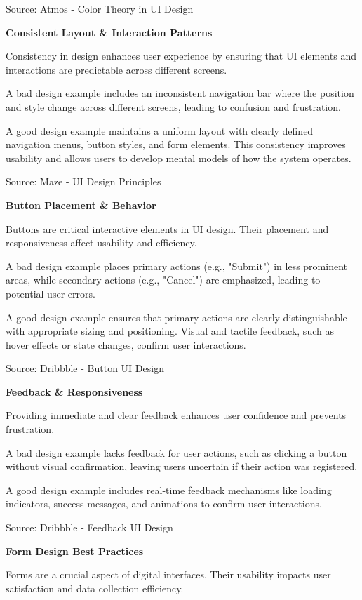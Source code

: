 Source: Atmos - Color Theory in UI Design

\textbf{Consistent Layout \& Interaction Patterns}

Consistency in design enhances user experience by ensuring that UI elements and interactions are predictable across different screens.

A bad design example includes an inconsistent navigation bar where the position and style change across different screens, leading to confusion and frustration.

A good design example maintains a uniform layout with clearly defined navigation menus, button styles, and form elements. This consistency improves usability and allows users to develop mental models of how the system operates.

Source: Maze - UI Design Principles

\textbf{Button Placement \& Behavior}

Buttons are critical interactive elements in UI design. Their placement and responsiveness affect usability and efficiency.

A bad design example places primary actions (e.g., "Submit") in less prominent areas, while secondary actions (e.g., "Cancel") are emphasized, leading to potential user errors.

A good design example ensures that primary actions are clearly distinguishable with appropriate sizing and positioning. Visual and tactile feedback, such as hover effects or state changes, confirm user interactions.

Source: Dribbble - Button UI Design

\textbf{Feedback \& Responsiveness}

Providing immediate and clear feedback enhances user confidence and prevents frustration.

A bad design example lacks feedback for user actions, such as clicking a button without visual confirmation, leaving users uncertain if their action was registered.

A good design example includes real-time feedback mechanisms like loading indicators, success messages, and animations to confirm user interactions.

Source: Dribbble - Feedback UI Design

\textbf{Form Design Best Practices}

Forms are a crucial aspect of digital interfaces. Their usability impacts user satisfaction and data collection efficiency.

